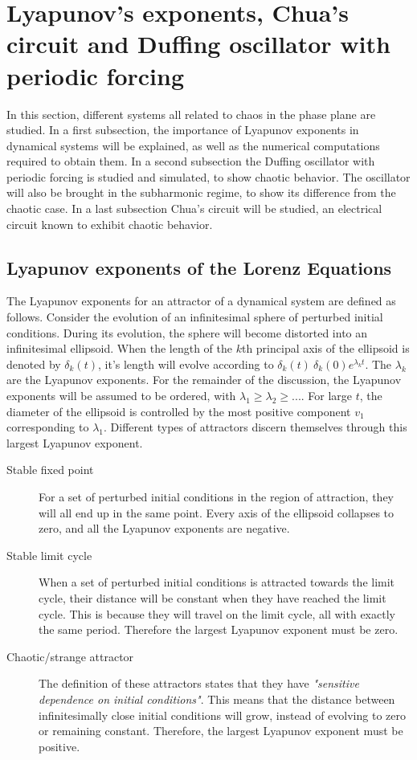 \section{Lyapunov's exponents, Chua's circuit and Duffing oscillator with periodic forcing}
In this section, different systems all related to chaos in the phase plane are studied. In a first subsection, the importance of Lyapunov exponents in dynamical systems will be explained, as well as the numerical computations required to obtain them. In a second subsection the Duffing oscillator with periodic forcing is studied and simulated, to show chaotic behavior. The oscillator will also be brought in the subharmonic regime, to show its difference from the chaotic case. In a last subsection Chua's circuit will be studied, an electrical circuit known to exhibit chaotic behavior. 
\subsection{Lyapunov exponents of the Lorenz Equations}
The Lyapunov exponents for an attractor of a dynamical system are defined as follows. Consider the evolution of an infinitesimal sphere of perturbed initial conditions. During its evolution, the sphere will become distorted into an infinitesimal ellipsoid. When the length of the $k$th principal axis of the ellipsoid is denoted by $\delta_k(t)$, it's length will evolve according to $\delta_k(t)~\delta_k(0)e^{\lambda_kt}$. The $\lambda_k$ are the Lyapunov exponents. For the remainder of the discussion, the Lyapunov exponents will be assumed to be ordered, with $\lambda_1\geq\lambda_2\geq...$. For large $t$, the diameter of the ellipsoid is controlled by the most positive component $v_1$ corresponding to $\lambda_1$. Different types of attractors discern themselves through this largest Lyapunov exponent.
\begin{description}
\item[Stable fixed point] For a set of perturbed initial conditions in the region of attraction, they will all end up in the same point. Every axis of the ellipsoid collapses to zero, and all the Lyapunov exponents are negative.
\item[Stable limit cycle] When a set of perturbed initial conditions is attracted towards the limit cycle, their distance will be constant when they have reached the limit cycle. This is because they will travel on the limit cycle, all with exactly the same period. Therefore the largest Lyapunov exponent must be zero.
\item[Chaotic/strange attractor] The definition of these attractors states that they have \textit{"sensitive dependence on initial conditions"}. This means that the distance between infinitesimally close initial conditions will grow, instead of evolving to zero or remaining constant. Therefore, the largest Lyapunov exponent must be positive.
\end{description}

